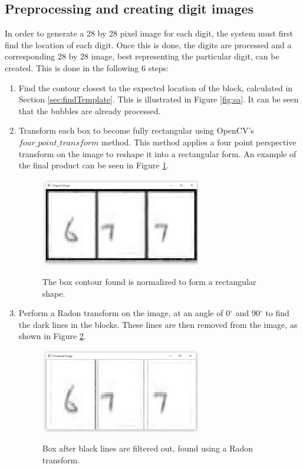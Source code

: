 \subsection{Preprocessing and creating digit images}
\label{sec:preprocess}

In order to generate a 28 by 28 pixel image for each digit, the system must first find the location of each digit. Once this is done, the digits are processed and a corresponding 28 by 28 image, best representing the particular digit, can be created. This is done in the following 6 steps:

\begin{enumerate}
\item Find the contour closest to the expected location of the block, calculated in Section \ref{sec:findTemplate}. This is illustrated in Figure \ref{fig:sa}. It can be seen that the bubbles are already processed.

\item Transform each box to become fully rectangular using OpenCV's $four\_point\_transform$ method. This method applies a four point perspective transform on the image to reshape it into a rectangular form. An example of the final product can be seen in Figure \ref{fig:bp}.

\begin{figure}
  \centering
  \includegraphics[width=7cm]{BeforeProcessing}\\
  \caption{The box contour found is normalized to form a rectangular shape.}
  \label{fig:bp}
\end{figure}

\item Perform a Radon transform on the image, at an angle of 0$^{\circ}$ and 90$^{\circ}$ to find the dark lines in the blocks. These lines are then removed from the image, as shown in Figure \ref{fig:ar}. 

\begin{figure}
  \centering
  \includegraphics[width=7cm]{AfterRadon}\\
  \caption{Box after black lines are filtered out, found using a Radon transform.}
  \label{fig:ar}
\end{figure}


\end{enumerate}
